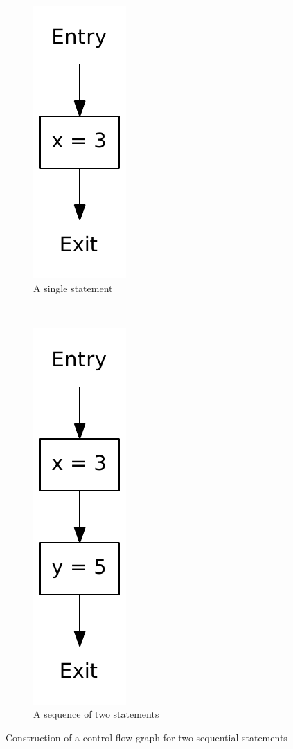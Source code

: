 \begin{figure}
  \begin{subfigure}[b]{0.49\textwidth}
    \center
    \includegraphics[scale=0.4]{figures/simple.pdf}
    \caption{A single statement}
  \end{subfigure}
  ~
  \begin{subfigure}[b]{0.49\textwidth}
    \center
    \includegraphics[scale=0.4]{figures/sequence.pdf}
    \caption{A sequence of two statements}
  \end{subfigure}
  \caption{Construction of a control flow graph for two sequential statements}
  \label{cfg_sequence}
\end{figure}

